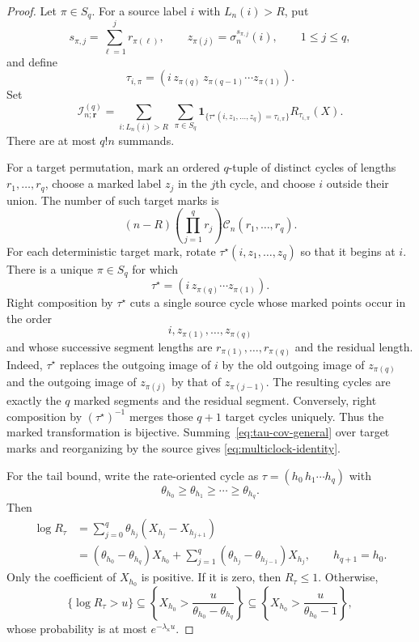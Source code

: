 \documentclass[11pt]{article}
\theoremstyle{remark}
\newcommand{\one}{\mathbf 1}
\begin{document}
\begin{proof}
Let $\pi\in S_q$.  For a source label $i$ with $L_n(i)>R$, put
\[
 s_{\pi,j}=\sum_{\ell=1}^j r_{\pi(\ell)},
 \qquad
 z_{\pi(j)}=\sigma_n^{s_{\pi,j}}(i),
 \qquad 1\le j\le q,
\]
and define
\begin{equation}
\label{eq:tau-pi}
 \tau_{i,\pi}=(i\,z_{\pi(q)}\,z_{\pi(q-1)}\cdots z_{\pi(1)}).
\end{equation}
Set
\begin{equation}
\label{eq:Iq}
 \mathcal I_{n;\mathbf r}^{(q)}
 =\sum_{i:L_n(i)>R}\ \sum_{\pi\in S_q}
 \one_{\{\tau^\star(i,z_1,\ldots,z_q)=\tau_{i,\pi}\}}
 R_{\tau_{i,\pi}}(X).
\end{equation}
There are at most $q!n$ summands.

For a target permutation, mark an ordered $q$-tuple of distinct cycles of
lengths $r_1,\ldots,r_q$, choose a marked label $z_j$ in the $j$th cycle,
and choose $i$ outside their union.  The number of such target marks is
\[
 (n-R)\left(\prod_{j=1}^q r_j\right)
 \mathcal C_n(r_1,\ldots,r_q).
\]
For each deterministic target mark, rotate
$\tau^\star(i,z_1,\ldots,z_q)$ so that it begins at $i$.  There is a unique
$\pi\in S_q$ for which
\[
 \tau^\star=(i\,z_{\pi(q)}\cdots z_{\pi(1)}).
\]
Right composition by $\tau^\star$ cuts a single source cycle whose marked
points occur in the order
\[
 i,z_{\pi(1)},\ldots,z_{\pi(q)}
\]
and whose successive segment lengths are
$r_{\pi(1)},\ldots,r_{\pi(q)}$ and the residual length.  Indeed,
$\tau^\star$ replaces the outgoing image of $i$ by the old outgoing image
of $z_{\pi(q)}$ and the outgoing image of $z_{\pi(j)}$ by that of
$z_{\pi(j-1)}$.  The resulting cycles are exactly the $q$ marked segments
and the residual segment.  Conversely, right composition by
$(\tau^\star)^{-1}$ merges those $q+1$ target cycles uniquely.  Thus the
marked transformation is bijective.  Summing~\eqref{eq:tau-cov-general}
over target marks and reorganizing by the source gives
\eqref{eq:multiclock-identity}.

For the tail bound, write the rate-oriented cycle as
$\tau=(h_0\,h_1\cdots h_q)$ with
\[
 \theta_{h_0}\ge\theta_{h_1}\ge\cdots\ge\theta_{h_q}.
\]
Then
\begin{align*}
 \log R_\tau
 &=\sum_{j=0}^q\theta_{h_j}(X_{h_j}-X_{h_{j+1}})\\
 &=(\theta_{h_0}-\theta_{h_q})X_{h_0}
   +\sum_{j=1}^q(\theta_{h_j}-\theta_{h_{j-1}})X_{h_j},
 \qquad h_{q+1}=h_0.
\end{align*}
Only the coefficient of $X_{h_0}$ is positive.  If it is zero, then
$R_\tau\le1$.  Otherwise,
\[
 \{\log R_\tau>u\}
 \subseteq
 \left\{X_{h_0}>\frac{u}{\theta_{h_0}-\theta_{h_q}}\right\}
 \subseteq
 \left\{X_{h_0}>\frac{u}{\theta_{h_0}-1}\right\},
\]
whose probability is at most $e^{-\lambda_\kappa u}$.


\end{proof}
\end{document}
